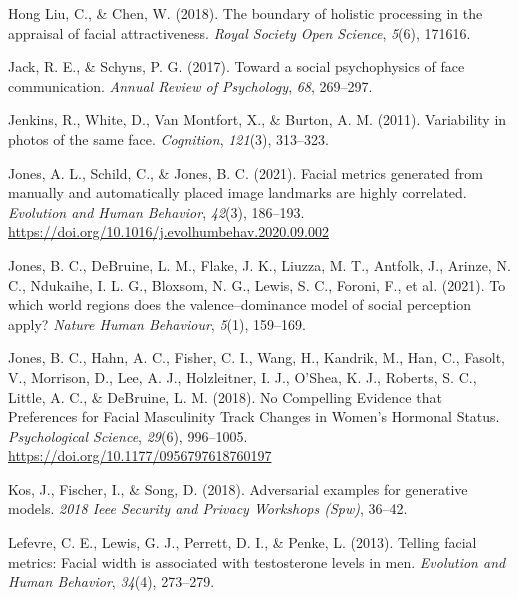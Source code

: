 \documentclass[
  man,floatsintext]{apa6}
\newlength{\cslhangindent}
\newlength{\cslentryspacingunit} %
\newenvironment{CSLReferences}[2] %
 {%
  \setlength{\parindent}{0pt}
  \ifodd #1
  \let\oldpar\par
  \def\par{\hangindent=\cslhangindent\oldpar}
  \fi
  \setlength{\parskip}{#2\cslentryspacingunit}
 }%
 {}
\begin{document}
\begin{CSLReferences}{1}{0}
\leavevmode{}%
Hong Liu, C., \& Chen, W. (2018). The boundary of holistic processing in the appraisal of facial attractiveness. \emph{Royal Society Open Science}, \emph{5}(6), 171616.

\leavevmode{}%
Jack, R. E., \& Schyns, P. G. (2017). Toward a social psychophysics of face communication. \emph{Annual Review of Psychology}, \emph{68}, 269--297.

\leavevmode{}%
Jenkins, R., White, D., Van Montfort, X., \& Burton, A. M. (2011). Variability in photos of the same face. \emph{Cognition}, \emph{121}(3), 313--323.

\leavevmode{}%
Jones, A. L., Schild, C., \& Jones, B. C. (2021). Facial metrics generated from manually and automatically placed image landmarks are highly correlated. \emph{Evolution and Human Behavior}, \emph{42}(3), 186--193. \url{https://doi.org/10.1016/j.evolhumbehav.2020.09.002}

\leavevmode{}%
Jones, B. C., DeBruine, L. M., Flake, J. K., Liuzza, M. T., Antfolk, J., Arinze, N. C., Ndukaihe, I. L. G., Bloxsom, N. G., Lewis, S. C., Foroni, F., et al. (2021). To which world regions does the valence--dominance model of social perception apply? \emph{Nature Human Behaviour}, \emph{5}(1), 159--169.

\leavevmode{}%
Jones, B. C., Hahn, A. C., Fisher, C. I., Wang, H., Kandrik, M., Han, C., Fasolt, V., Morrison, D., Lee, A. J., Holzleitner, I. J., O'Shea, K. J., Roberts, S. C., Little, A. C., \& DeBruine, L. M. (2018). No {Compelling} {Evidence} that {Preferences} for {Facial} {Masculinity} {Track} {Changes} in {Women}'s {Hormonal} {Status}. \emph{Psychological Science}, \emph{29}(6), 996--1005. \url{https://doi.org/10.1177/0956797618760197}

\leavevmode{}%
Kos, J., Fischer, I., \& Song, D. (2018). Adversarial examples for generative models. \emph{2018 Ieee Security and Privacy Workshops (Spw)}, 36--42.

\leavevmode{}%
Lefevre, C. E., Lewis, G. J., Perrett, D. I., \& Penke, L. (2013). Telling facial metrics: Facial width is associated with testosterone levels in men. \emph{Evolution and Human Behavior}, \emph{34}(4), 273--279.


\end{CSLReferences}
\end{document}
